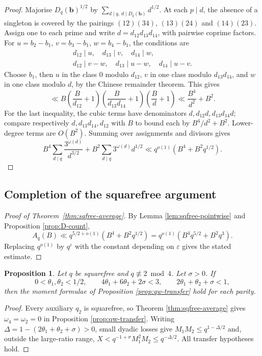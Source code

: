 \documentclass[12pt, a4paper]{amsart}
\numberwithin{equation}{section}
\newcommand{\ep}{\varepsilon}
\renewcommand{\le}{\leqslant}
\theoremstyle{plain}
\newtheorem{prop}[lem]{Proposition}
\begin{document}
\begin{proof}
Majorise $D_q(\mathbf b)^{1/2}$ by $\sum_{d\mid q,\ d\mid D_q(\mathbf b)}d^{1/2}$. At each $p\mid d$, the absence of a singleton is covered by the pairings $(12)(34)$, $(13)(24)$ and $(14)(23)$. Assign one to each prime and write $d=d_{12}d_{13}d_{14}$, with pairwise coprime factors. For $u=b_2-b_1$, $v=b_3-b_1$, $w=b_4-b_1$, the conditions are
$$
\begin{gathered}
d_{12}\mid u,\quad d_{13}\mid v,\quad d_{14}\mid w,\\
d_{12}\mid v-w,\quad d_{13}\mid u-w,\quad d_{14}\mid u-v.
\end{gathered}
$$
Choose $b_1$, then $u$ in the class $0$ modulo $d_{12}$, $v$ in one class modulo $d_{13}d_{14}$, and $w$ in one class modulo $d$, by the Chinese remainder theorem. This gives
$$
\ll B\left(\frac{B}{d_{12}}+1\right)
\left(\frac{B}{d_{13}d_{14}}+1\right)
\left(\frac{B}{d}+1\right)
\ll\frac{B^4}{d^2}+B^2.
$$
For the last inequality, the cubic terms have denominators $d,d_{12}d,d_{13}d_{14}d$; compare respectively $d,d_{13}d_{14},d_{12}$ with $B$ to bound each by $B^4/d^2+B^2$. Lower-degree terms are $O(B^2)$. Summing over assignments and divisors gives
$$
B^4\sum_{d\mid q}\frac{3^{\omega(d)}}{d^{3/2}}
+
B^2\sum_{d\mid q}3^{\omega(d)}d^{1/2}
\ll q^{o(1)}(B^4+B^2q^{1/2}).
$$
\end{proof}

\subsection{Completion of the squarefree argument}

\begin{proof}[Proof of Theorem~\ref{thm:sqfree-average}]
By Lemma \ref{lem:sqfree-pointwise} and Proposition \ref{prop:D-count},
$$
A_q(B)\ll q^{5/2+o(1)}(B^4+B^2q^{1/2})
=q^{o(1)}(B^4q^{5/2}+B^2q^3).
$$
Replacing $q^{o(1)}$ by $q^\ep$ with the constant depending on $\ep$ gives the stated estimate.
\end{proof}

\begin{prop}\label{prop:sqfree-moment}
Let $q$ be squarefree and $q\not\equiv2\bmod4$. Let $\sigma>0$. If
$$
0<\theta_1,\theta_2<1/2,
\qquad
4\theta_1+6\theta_2+2\sigma<3,
\qquad
2\theta_1+\theta_2+\sigma<1,
$$
then the moment formulae of Proposition \ref{prop:qw-transfer} hold for each parity.
\end{prop}

\begin{proof}
Every auxiliary $q_2$ is squarefree, so Theorem \ref{thm:sqfree-average} gives $\omega_4=\omega_2=0$ in Proposition \ref{prop:qw-transfer}. Writing $\Delta=1-(2\theta_1+\theta_2+\sigma)>0$, small dyadic losses give $M_1M_2\le q^{1-\Delta/2}$ and, outside the large-ratio range, $X<q^{-1+\sigma}M_1^2M_2\le q^{-\Delta/2}$. All transfer hypotheses hold.
\end{proof}
\end{document}
